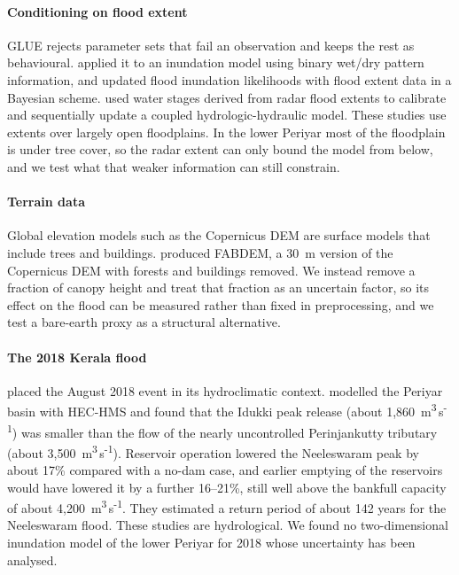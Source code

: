 \documentclass[preprint,12pt,authoryear]{elsarticle}
\newcommand{\cumecs}{m\textsuperscript{3}\,s\textsuperscript{-1}}
\begin{document}
\paragraph{Conditioning on flood extent}
GLUE \citep{beven1992} rejects parameter sets that fail an observation and keeps the rest as behavioural. \citet{aronica2002} applied it to an inundation model using binary wet/dry pattern information, and \citet{bates2004} updated flood inundation likelihoods with flood extent data in a Bayesian scheme. \citet{montanari2009} used water stages derived from radar flood extents to calibrate and sequentially update a coupled hydrologic-hydraulic model. These studies use extents over largely open floodplains. In the lower Periyar most of the floodplain is under tree cover, so the radar extent can only bound the model from below, and we test what that weaker information can still constrain.

\paragraph{Terrain data}
Global elevation models such as the Copernicus DEM are surface models that include trees and buildings. \citet{hawker2022} produced FABDEM, a 30~m version of the Copernicus DEM with forests and buildings removed. We instead remove a fraction of canopy height and treat that fraction as an uncertain factor, so its effect on the flood can be measured rather than fixed in preprocessing, and we test a bare-earth proxy as a structural alternative.

\paragraph{The 2018 Kerala flood}
\citet{mishra2018} placed the August 2018 event in its hydroclimatic context. \citet{sudheer2019} modelled the Periyar basin with HEC-HMS and found that the Idukki peak release (about 1,860~\cumecs) was smaller than the flow of the nearly uncontrolled Perinjankutty tributary (about 3,500~\cumecs). Reservoir operation lowered the Neeleswaram peak by about 17\% compared with a no-dam case, and earlier emptying of the reservoirs would have lowered it by a further 16--21\%, still well above the bankfull capacity of about 4,200~\cumecs. They estimated a return period of about 142 years for the Neeleswaram flood. These studies are hydrological. We found no two-dimensional inundation model of the lower Periyar for 2018 whose uncertainty has been analysed.
\end{document}
